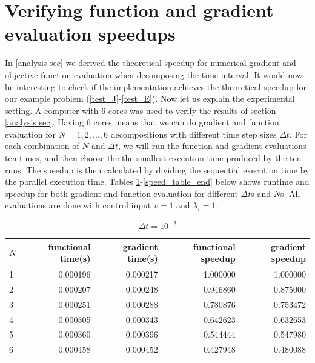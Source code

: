 \section{Verifying function and gradient evaluation speedups} \label{ver S sec}
In \ref{analysis sec} we derived the theoretical speedup for numerical gradient and objective function evaluation when decomposing the time-interval. It would now be interesting to check if the implementation achieves the theoretical speedup for our example problem (\ref{test_J}-\ref{test_E}). Now let us explain the experimental setting. A computer with 6 cores was used to verify the results of section \ref{analysis sec}. Having 6 cores means that we can do gradient and function evaluation for $N=1,2,...,6$ decompositions with different time step sizes $\Delta t$. For each combination of $N$ and $\Delta t$, we will run the function and gradient evaluations ten times, and then choose the the smallest execution time produced by the ten runs. The speedup is then calculated by dividing the sequential execution time by the parallel execution time. Tables \ref{Speed_table1}-\ref{speed_table_end} below shows runtime and speedup for both gradient and function evaluation for different $\Delta t$s and $N$s. All evaluations are done with control input $v=1$ and $\lambda_i=1$.  
\\
\begin{table}[!h]
\centering
\caption{$\Delta t=10^{-2}$}
\label{Speed_table1}
\begin{tabular}{lrrrr}
\toprule
{}$N$ &  functional time(s) &  gradient time(s) &  functional speedup &  gradient speedup \\
\midrule
1 &           0.000196 &          0.000217 &            1.000000 &          1.000000 \\
2 &           0.000207 &          0.000248 &            0.946860 &          0.875000 \\
3 &           0.000251 &          0.000288 &            0.780876 &          0.753472 \\
4 &           0.000305 &          0.000343 &            0.642623 &          0.632653 \\
5 &           0.000360 &          0.000396 &            0.544444 &          0.547980 \\
6 &           0.000458 &          0.000452 &            0.427948 &          0.480088 \\
\bottomrule
\end{tabular}
\end{table}

